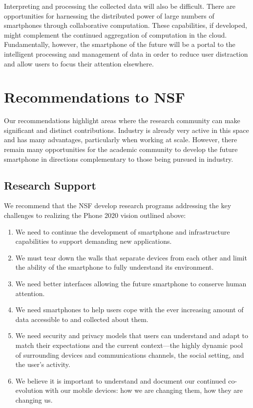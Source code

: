 Interpreting and processing the collected data will also be difficult. There
are opportunities for harnessing the distributed power of large numbers of
smartphones through collaborative computation. These capabilities, if
developed, might complement the continued aggregation of computation in the
cloud. Fundamentally, however, the smartphone of the future will be a portal
to the intelligent processing and management of data in order to reduce user
distraction and allow users to focus their attention elsewhere.

\section{Recommendations to NSF}

Our recommendations highlight areas where the research community can make
significant and distinct contributions. Industry is already very active in
this space and has many advantages, particularly when working at scale.
However, there remain many opportunities for the academic community to
develop the future smartphone in directions complementary to those being
pursued in industry.

\subsection{Research Support}

We recommend that the NSF develop research programs addressing the key
challenges to realizing the Phone 2020 vision outlined above:

\begin{enumerate}

\item We need to continue the development of smartphone and infrastructure
capabilities to support demanding new applications.

\item We must tear down the walls that separate devices from each other and
limit the ability of the smartphone to fully understand its environment.

\item We need better interfaces allowing the future smartphone to conserve human
attention.

\item We need smartphones to help users cope with the ever increasing amount of
data accessible to and collected about them.

\item We need security and privacy models that users can understand and adapt
to match their expectations and the current context---the highly dynamic pool
of surrounding devices and communications channels, the social setting, and
the user’s activity. 

\item We believe it is important to understand and document our continued
co-evolution with our mobile devices: how we are changing them, how they are
changing us.

\end{enumerate}

